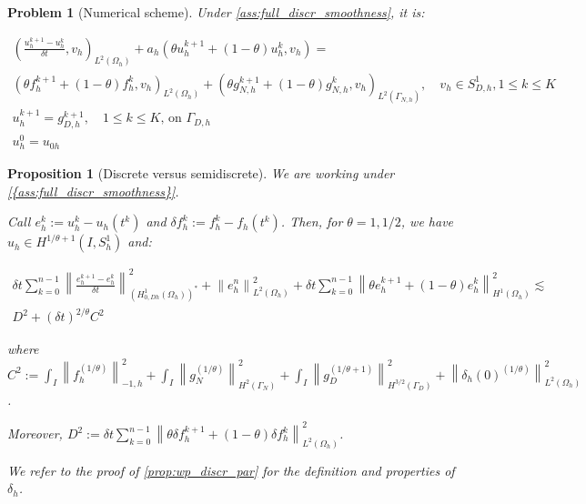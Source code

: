 \documentclass[english,a4paper,10pt,oneside]{scrbook}	%
\theoremstyle{break}
\newtheorem{prop}[equation]{Proposition}
\newtheorem{pb}[equation]{Problem}
\theoremstyle{remark}
\newcommand{\ds}{\displaystyle}
\newcommand{\norm}[1]{\left\lVert#1\right\rVert}
\begin{document}
\begin{pb}[Numerical scheme]
\label{pb:num_scheme}
Under \cref{ass:full_discr_smoothness}, it is:

\begin{align*}
\left ( \frac{u_{h}^{k+1}-u_h^k}{\delta t}, v_h\right)_{L^2(\Omega_h)} + a_h(\theta u_h^{k+1}+(1-\theta)u^k_h, v_h) =\\ (\theta f_h^{k+1}+(1-\theta)f_h^k, v_h)_{L^2(\Omega_h)} + (\theta g_{N,h}^{k+1} + (1 - \theta)g_{N,h}^{k} , v_h)_{L^2(\Gamma_{N,h})},\quad v_h \in S^1_{D,h}, 1\leq k \leq K\\
u_h^{k+1}=g_{D,h}^{k+1},\quad 1\leq k \leq K \text{,  on } \Gamma_{D,h}\\
u_h^0=u_{0h}
\end{align*}

\end{pb}

\begin{prop}[Discrete versus semidiscrete]
\label{prop:d_vd_sd}
We are working under \cref{{ass:full_discr_smoothness}}.

Call $e_h^k:=u_h^k-u_h(t^k)$ and $\delta f_h^k:=f_h^k-f_h(t^k)$. Then, for $\theta=1, 1/2$, we have $u_h \in H^{1/\theta+1}(I, S^1_h)$ and:

\begin{align*}
\delta t \sum_{k=0}^{n-1} \norm{ \frac{e_{h}^{k+1}-e_h^k}{\delta t}}_{(H^1_{0,Dh}(\Omega_h))^*}^2 + \norm{e_{h}^{n}}_{L^2(\Omega_h)}^2 + \delta t \sum_{k=0}^{n-1}\norm{\theta e_h^{k+1}+(1-\theta)e^k_h}_{H^1(\Omega_h)}^2 \lesssim \\
D^2 + (\delta t)^{2/\theta} C^2
\end{align*}

where $C^2:=\ds \int_I \norm{f^{(1/\theta)}_h}_{-1,h}^2+\int_I\norm{ g_{N}^{(1/\theta)}}_{H^{2}(\Gamma_{N})}^2 + \int_I\norm{g_D^{(1/\theta+1)}}_{H^{3/2}(\Gamma_D)}^2 + \norm{\delta_{h}(0)^{(1/\theta)}}_{L^2(\Omega_h)}^2$.

Moreover, $\ds D^2:= \ds {\delta t\sum_{k=0}^{n-1} \norm{\theta \delta f_h^{k+1}+(1-\theta)\delta f_h^k}_{L^2(\Omega_h)}^2}$.

We refer to the proof of \cref{prop:wp_discr_par} for the definition and properties of $\delta_h$.

\end{prop}
\end{document}
